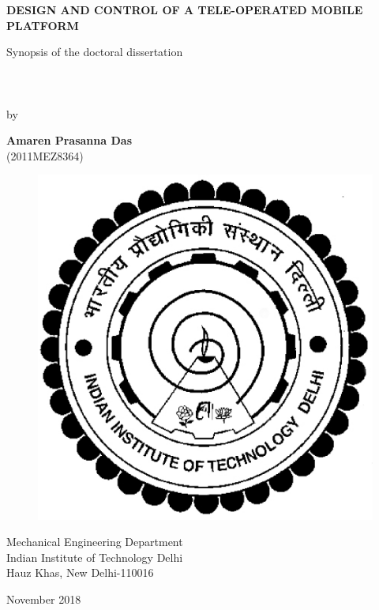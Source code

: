 \begin{center}
\vspace*{20pt}
\begin{LARGE}
\textbf{DESIGN AND CONTROL OF A TELE-OPERATED MOBILE PLATFORM}\\
\end{LARGE}
\vspace*{60pt}
\begin{Large}
Synopsis of the doctoral dissertation\\
~\\
~\\
~\\
by\\
\end{Large}
\vspace*{50pt}
\begin{large}
\textbf{Amaren Prasanna Das}\\
(2011MEZ8364)\\
\end{large}
\vspace*{40pt}
\begin{figure}[h]
\centering
\includegraphics[scale=0.3]{fig/iitlogo.eps}
\label{iitd}
\end{figure}
\vspace*{40pt}
\begin{Large}
Mechanical Engineering Department\\
Indian Institute of Technology Delhi\\
Hauz Khas, New Delhi-110016\\
\end{Large}
\vspace*{10pt}
November 2018
\end{center}
\thispagestyle{empty}
\newpage
\thispagestyle{empty}